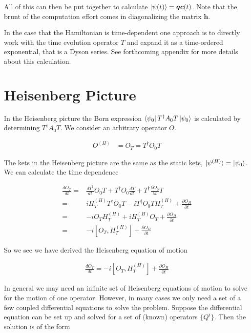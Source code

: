\documentclass[12pt]{article}
\newcommand{\bv}[1]{\boldsymbol{#1}}
\begin{document}
All of this can then be put together to calculate $\ket{\psi(t)} = \bv{q}\bv{c}(t)$.
Note that the brunt of the computation effort comes in diagonalizing the matrix $\bv{h}$.

In the case that the Hamiltonian is time-dependent one approach is to directly work with the time evolution operator $T$ and expand it as a time-ordered exponential, that is a Dyson series.
See forthcoming appendix for more details about this calculation.


\section{Heisenberg Picture}

In the Heisenberg picture the Born expression $\bra{\psi_0}T^{\dag}A_0T\ket{\psi_0}$ is calculated by determining $T^{\dag}A_0T$. 
We consider an arbitrary operator $O$.

\begin{align}
O^{(H)} &= O_T =  T^{\dag}O_0T
\end{align}

The kets in the Heisenberg picture are the same as the static kets, $\ket{\psi^{(H)}} = \ket{\psi_0}$.
We can calculate the time dependence

\begin{align}
\frac{dO_T}{dt} =& \frac{dT^{\dag}}{dt}O_0 T + T^{\dag}O_0 \frac{dT}{dt} + T^{\dag}\frac{\partial O_0}{\partial t}T \nonumber\\
=& iH_T^{(H)}T^{\dag}O_0T -iT^{\dag}O_0TH_T^{(H)} + \frac{\partial O_H}{\partial t} \nonumber\\
=& -i O_T H_T^{(H)} + iH_T^{(H)}O_T + \frac{\partial O_H}{\partial t} \nonumber\\
=& -i[O_T, H_T^{(H)}] + \frac{\partial O_H}{\partial t}
\end{align}

So we see we have derived the Heisenberg equation of motion

\begin{align}
\frac{dO_T}{dt} = -i[O_T, H_T^{(H)}] + \frac{\partial O_H}{\partial t}
\end{align}

In general we may need an infinite set of Heisenberg equations of motion to solve for the motion of one operator.
However, in many cases we only need a set of a few coupled differential equations to solve the problem.
Suppose the differential equation can be set up and solved for a set of (known) operators $\{Q^i\}$. 
Then the solution is of the form
\end{document}
